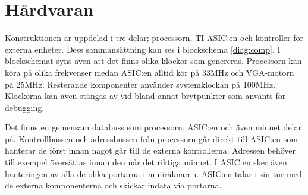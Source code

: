 \documentclass[main.tex]{subfiles}
\begin{document}
\section{Hårdvaran}
Konstruktionen är uppdelad i tre delar; processorn, TI-ASIC:en och kontroller
för externa enheter. Dess sammansättning kan ses i blockschema \ref{diag:comp}.
I blockschemat syns även att det finns olika klockor som genereras. Processorn
kan köra på olika frekvenser medan ASIC:en alltid kör på 33MHz och VGA-motorn
på 25MHz. Resterande komponenter använder systemklockan på 100MHz. Klockorna
kan även stängas av vid bland annat brytpunkter som använts för debugging.

Det finns en gemensam databuss som processorn, ASIC:en och även minnet delar
på. Kontrollbussen och adressbussen från processorn går direkt till ASIC:en som
hanterar de först innan något går till de externa kontrollerna. Adressen
behöver till exempel översättas innan den når det riktiga minnet. I ASIC:en
sker även hanteringen av alla de olika portarna i miniräknaren. ASIC:en talar i
sin tur med de externa komponenterna och skickar indata via portarna.




\end{document}
